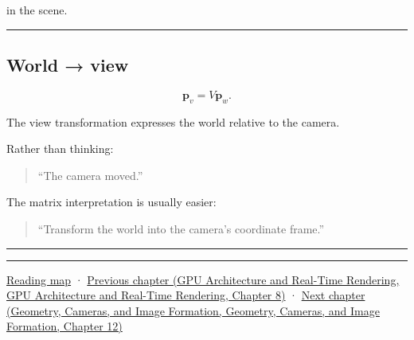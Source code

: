 in the scene.

\begin{center}\rule{0.5\linewidth}{0.5pt}\end{center}

\subsection{World → view}\label{03-visual-computing-i-ch012-world-view}

\[
\mathbf p_v=V\mathbf p_w.
\]

The view transformation expresses the world relative to the camera.

Rather than thinking:

\begin{quote}
``The camera moved.''
\end{quote}

The matrix interpretation is usually easier:

\begin{quote}
``Transform the world into the camera's coordinate frame.''
\end{quote}

\begin{center}\rule{0.5\linewidth}{0.5pt}\end{center}

\begin{center}\rule{0.5\linewidth}{0.5pt}\end{center}

\hyperref[volume-reading-map]{Reading map} · \href{../06-GPU-Architecture-and-Real-Time-Rendering/main.pdf\#nameddest=03-visual-computing-i-ch011-bvh-traversal-and-deterministic-evidence}{Previous chapter (GPU Architecture and Real-Time Rendering, GPU Architecture and Real-Time Rendering, Chapter 8)} · \href{../03-Geometry-Cameras-and-Image-Formation/main.pdf\#nameddest=03-visual-computing-i-ch013-from-view-space-to-clip-space}{Next chapter (Geometry, Cameras, and Image Formation, Geometry, Cameras, and Image Formation, Chapter 12)}
